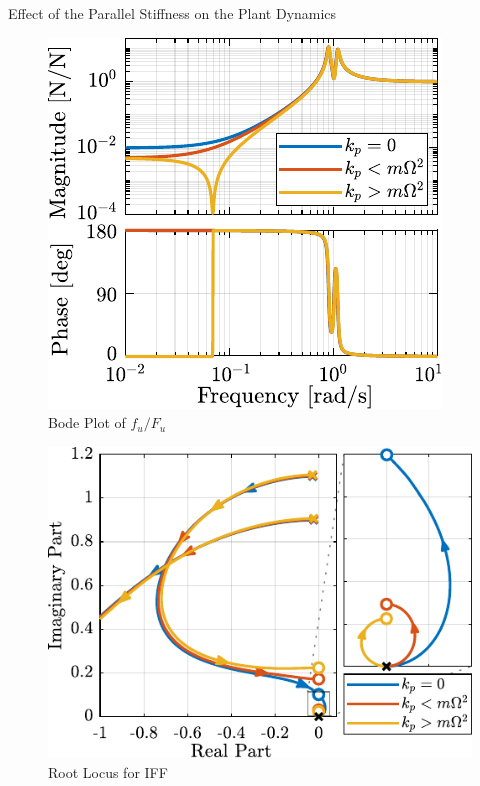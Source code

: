 \documentclass[t, minted]{clean-beamer}
\begin{document}
\begin{frame}[label={sec:org497c282}]{Effect of the Parallel Stiffness on the Plant Dynamics}
\begin{minipage}[b]{0.42\linewidth}
\begin{figure}[htbp]
\centering
\includegraphics[width=\linewidth]{figs/plant_iff_kp.pdf}
\caption{Bode Plot of \(f_u/F_u\)}
\end{figure}
\end{minipage}
\hfill
\begin{minipage}[b]{0.55\linewidth}
\begin{figure}[htbp]
\centering
\includegraphics[width=\linewidth]{figs/root_locus_iff_kp.pdf}
\caption{Root Locus for IFF}
\end{figure}
\end{minipage}


\end{frame}
\end{document}
